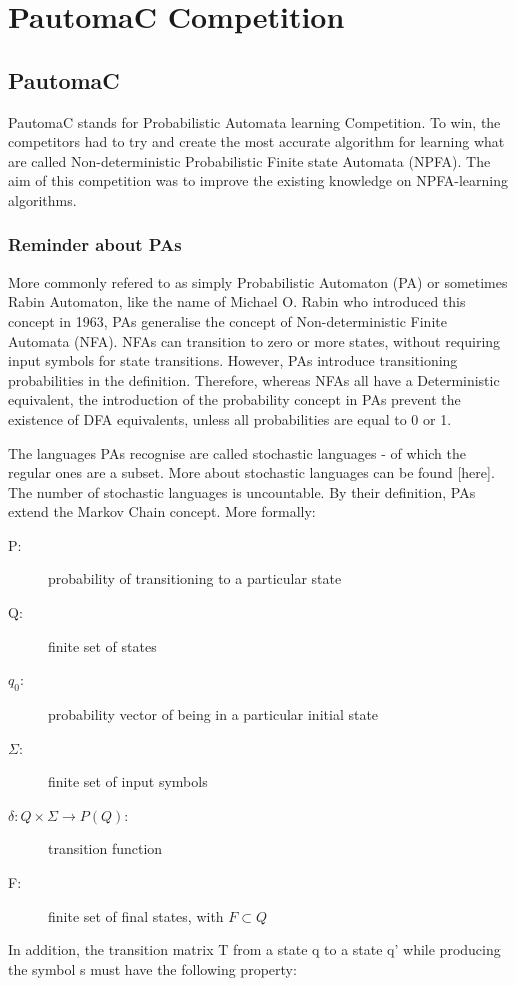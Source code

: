 \section{PautomaC Competition}

\subsection{PautomaC}

PautomaC stands for Probabilistic Automata learning Competition. To
win, the competitors had to try and create the most accurate algorithm
for learning what are called Non-deterministic Probabilistic Finite
state Automata (NPFA). The aim of this competition was to improve
the existing knowledge on NPFA-learning algorithms.


\subsubsection{Reminder about PAs}

More commonly refered to as simply Probabilistic Automaton (PA) or
sometimes Rabin Automaton, like the name of Michael O. Rabin who introduced
this concept in 1963, PAs generalise the concept of Non-deterministic
Finite Automata (NFA). NFAs can transition to zero or more states,
without requiring input symbols for state transitions. However, PAs
introduce transitioning probabilities in the definition. Therefore,
whereas NFAs all have a Deterministic equivalent, the introduction
of the probability concept in PAs prevent the existence of DFA equivalents,
unless all probabilities are equal to 0 or 1.

The languages PAs recognise are called stochastic languages - of which
the regular ones are a subset. More about stochastic languages can
be found {[}here{]}. The number of stochastic languages is uncountable.
By their definition, PAs extend the Markov Chain concept. More formally:
\begin{description}
\item [{P:}] probability of transitioning to a particular state
\item [{Q:}] finite set of states
\item [{$q_{0}$:}] probability vector of being in a particular initial
state
\item [{$\varSigma$:}] finite set of input symbols
\item [{$\delta:Q\times\varSigma\longrightarrow P(Q)$:}] transition function
\item [{F:}] finite set of final states, with $F\subset Q$
\end{description}
In addition, the transition matrix T from a state q to a state q'
while producing the symbol s must have the following property:

